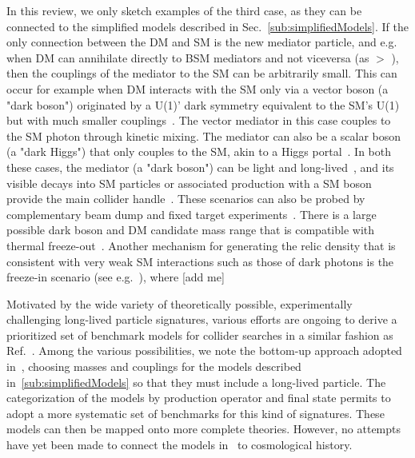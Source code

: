 In this review, we only sketch examples of the third case, as they can be connected to the simplified models described in Sec.~\ref{sub:simplifiedModels}. If the only connection between the DM and SM is the new mediator particle, and e.g. when DM can annihilate directly to BSM mediators and not viceversa (as \mdm $>$ \mmed), then the couplings of the mediator to the SM can be arbitrarily small. This can occur for example when DM interacts with the SM only via a vector boson (a "dark boson") originated by a U(1)' dark symmetry equivalent to the SM's U(1) but with much smaller couplings~\cite{Holdom:1985ag}. The vector mediator in this case couples to the SM photon through kinetic mixing. The mediator can also be a scalar boson (a "dark Higgs") that only couples to the SM, akin to a Higgs portal~\cite{Curtin:2014cca}. %
In both these cases, the mediator (a "dark boson") can be light and long-lived~\cite{Pospelov:2007mp}, and its visible decays into SM particles or associated production with a SM boson provide the main collider handle~\cite{Curtin:2014cca}. These scenarios can also be probed by complementary beam dump and fixed target experiments~\cite{Battaglieri:2017aum}. 
There is a large possible dark boson and DM candidate mass range that is compatible with thermal freeze-out~\cite{Das:2010ts}. Another mechanism for generating the relic density that is consistent with very weak SM interactions such as those of dark photons is the freeze-in scenario (see e.g.~\cite{Co:2015pka,Bernal:2017kxu}), where [add me]

Motivated by the wide variety of theoretically possible, experimentally challenging long-lived particle signatures, various efforts are ongoing to derive a prioritized set of benchmark models for collider searches in a similar fashion as Ref.~\cite{Abercrombie:2015wmb}. Among the various possibilities, we note the bottom-up approach adopted in~\cite{Buchmueller:2017uqu}, choosing masses and couplings for the models described in~\ref{sub:simplifiedModels} so that they must include a long-lived particle. The categorization of the models by production operator and final state permits to adopt a more systematic set of benchmarks for this kind of signatures. These models can then be mapped onto more complete theories. However, no attempts have yet been made to connect the models in~\cite{Buchmueller:2017uqu} to cosmological history. 
